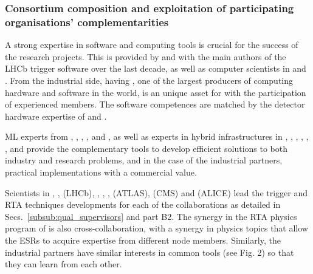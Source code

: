 \subsubsection{Consortium composition and exploitation of participating organisations' complementarities}
\label{sub:composition}


A strong expertise in software and computing tools is crucial for the success of the research projects. This is provided by \nikhefentity and \cernentity with the main authors of the LHCb trigger software over the last decade, as well as computer scientists in \sorbonneentity and \uniboentity. From the industrial side, having \ibmentity, one of the largest producers of computing hardware and software in the world, is an unique asset for \acronym with the participation of experienced members. The software competences are matched by the detector hardware expertise of \lundentity and \cernentity. 

ML experts from \liegesentity, \uniboentity, \pointeightentity, \ximantisentity, \cernentity and \ibmentity, as well as experts in hybrid infrastructures in \sorbonneentity, \santiagoentity, \pisaentity, \cnrsentity, \oregonentity, \ohioentity, \fleetmaticsentity and \lightboxentity provide the complementary tools to develop efficient solutions to both industry and research problems, and in the case of the industrial partners, practical implementations with a commercial value. 

Scientists in \nikhefentity, \cnrsentity, \dortmundentity (LHCb), \oregonentity, \ohioentity, \lundentity, \heidelbergentity (ATLAS), \helsinkientity (CMS)  and \lundentity (ALICE) lead the trigger and RTA techniques developments for each of the collaborations as detailed in Secs.~\ref{subsub:qual_supervisors} and part B2. The synergy in the RTA physics program of \acronym is also cross-collaboration, with a synergy in physics topics that allow the ESRs to acquire expertise from different node members. Similarly, the industrial partners have similar interests in common tools (see Fig. 2) so that they can learn from each other. 

